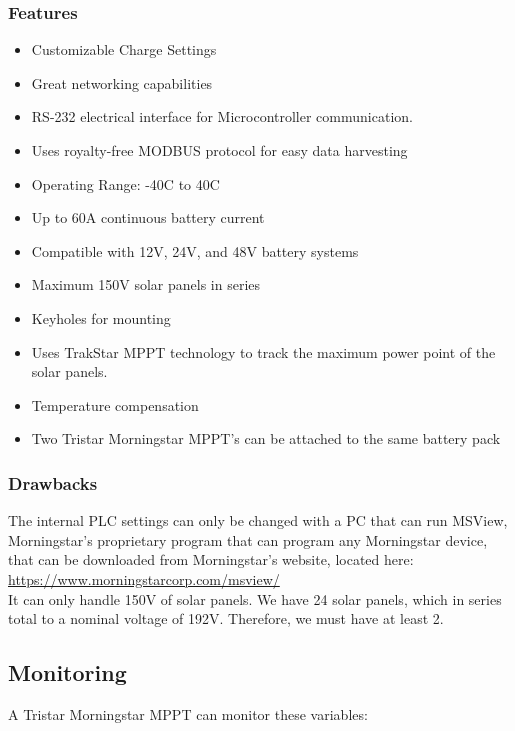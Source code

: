 \subsubsection{Features}
\begin{itemize}
	\item Customizable Charge Settings
	\item Great networking capabilities
	\item RS-232 electrical interface for Microcontroller communication.
	\item Uses royalty-free MODBUS protocol for easy data harvesting
	\item Operating Range: -40\degree C to 40\degree C
	\item Up to 60A continuous battery current
	\item Compatible with 12V, 24V, and 48V battery systems
	\item Maximum 150V solar panels in series
	\item Keyholes for mounting
	\item Uses TrakStar MPPT technology to track the maximum power point of the solar panels.
	\item Temperature compensation
	\item Two Tristar Morningstar MPPT’s can be attached to the same battery pack
\end{itemize}

\subsubsection{Drawbacks}

The internal PLC settings can only be changed with a PC that can run MSView, Morningstar’s proprietary program that can program any Morningstar device, that can be downloaded from Morningstar’s website, located here:\\

\href{https://www.morningstarcorp.com/msview/}{https://www.morningstarcorp.com/msview/}\\

It can only handle 150V of solar panels. We have 24 solar panels, which in series total to a nominal voltage of 192V. Therefore, we must have at least 2.


\subsection{Monitoring}

A Tristar Morningstar MPPT can monitor these variables:


